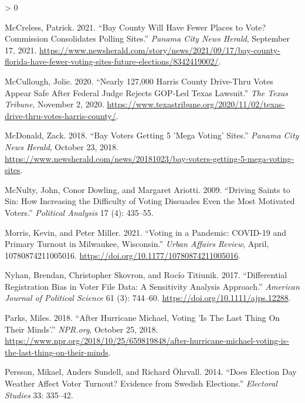 \documentclass[
  12pt,
]{article}
\newlength{\cslhangindent}
\newenvironment{CSLReferences}[2] %
 {%
  \setlength{\parindent}{0pt}
  \ifodd #1 \everypar{\setlength{\hangindent}{\cslhangindent}}\ignorespaces\fi
  \ifnum #2 > 0
  \setlength{\parskip}{#2\baselineskip}
  \fi
 }%
 {}
\begin{document}
\begin{CSLReferences}{1}{0}
\leavevmode\hypertarget{ref-McCreless2021}{}%
McCreless, Patrick. 2021. {``Bay {County} Will Have Fewer Places to Vote? Commission Consolidates Polling Sites.''} \emph{Panama City News Herald}, September 17, 2021. \url{https://www.newsherald.com/story/news/2021/09/17/bay-county-florida-have-fewer-voting-sites-future-elections/8342419002/}.

\leavevmode\hypertarget{ref-McCullough2020}{}%
McCullough, Jolie. 2020. {``Nearly 127,000 {Harris County} Drive-Thru Votes Appear Safe After Federal Judge Rejects {GOP}-Led {Texas} Lawsuit.''} \emph{The Texas Tribune}, November 2, 2020. \url{https://www.texastribune.org/2020/11/02/texas-drive-thru-votes-harris-county/}.

\leavevmode\hypertarget{ref-McDonald2018}{}%
McDonald, Zack. 2018. {``Bay Voters Getting 5 'Mega Voting' Sites.''} \emph{Panama City News Herald}, October 23, 2018. \url{https://www.newsherald.com/news/20181023/bay-voters-getting-5-mega-voting-sites}.

\leavevmode\hypertarget{ref-McNulty2009}{}%
McNulty, John, Conor Dowling, and Margaret Ariotti. 2009. {``Driving {Saints} to {Sin}: How {Increasing} the {Difficulty} of {Voting Dissuades Even} the {Most Motivated Voters}.''} \emph{Political Analysis} 17 (4): 435--55.

\leavevmode\hypertarget{ref-Morris2021}{}%
Morris, Kevin, and Peter Miller. 2021. {``Voting in a {Pandemic}: {COVID}-19 and {Primary Turnout} in {Milwaukee}, {Wisconsin}.''} \emph{Urban Affairs Review}, April, 10780874211005016. \url{https://doi.org/10.1177/10780874211005016}.

\leavevmode\hypertarget{ref-Nyhan2017}{}%
Nyhan, Brendan, Christopher Skovron, and Rocío Titiunik. 2017. {``Differential {Registration Bias} in {Voter File Data}: A {Sensitivity Analysis Approach}.''} \emph{American Journal of Political Science} 61 (3): 744--60. \url{https://doi.org/10.1111/ajps.12288}.

\leavevmode\hypertarget{ref-Parks2018}{}%
Parks, Miles. 2018. {``After {Hurricane Michael}, {Voting} '{Is The Last Thing On Their Minds}'.''} \emph{NPR.org}, October 25, 2018. \url{https://www.npr.org/2018/10/25/659819848/after-hurricane-michael-voting-is-the-last-thing-on-their-minds}.

\leavevmode\hypertarget{ref-Persson2014}{}%
Persson, Mikael, Anders Sundell, and Richard Öhrvall. 2014. {``Does {Election Day Weather Affect Voter Turnout}? Evidence from {Swedish Elections}.''} \emph{Electoral Studies} 33: 335--42.


\end{CSLReferences}
\end{document}
